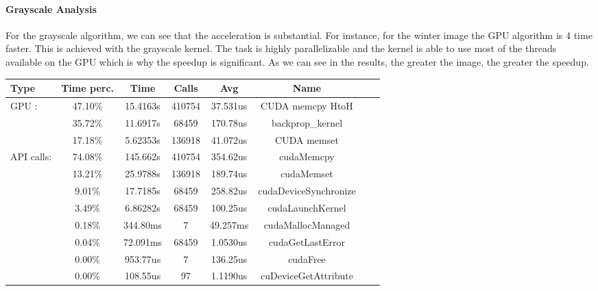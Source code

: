 \documentclass[11pt]{article}
\begin{document}
\paragraph*{Grayscale Analysis}
For the grayscale algorithm, we can see that the acceleration is substantial. For instance, for the winter image the GPU algorithm is 4 time faster. 
This is achieved with the grayscale kernel. The task is highly parallelizable and the kernel is able to use most of the threads available on the GPU
which is why the speedup is significant. 
As we can see in the results, the greater the image, the greater the speedup.

\begin{table}[h]\centering
	\begin{tabular}{|l|c|c|c|c|c|c|c|}
		\hline
		\textbf{Type} & \textbf{Time perc.} & \textbf{Time} & \textbf{Calls} & \textbf{Avg} & \textbf{Name}         \\ \hline
		GPU :         & 47.10\%             & 15.4163s      & 410754         & 37.531us     & CUDA memcpy HtoH      \\ \hline
		              & 35.72\%             & 11.6917s      & 68459          & 170.78us     & backprop\_kernel      \\ \hline
		              & 17.18\%             & 5.62353s      & 136918         & 41.072us     & CUDA memset           \\ \hline
		API calls:    & 74.08\%             & 145.662s      & 410754         & 354.62us     & cudaMemcpy            \\ \hline
		              & 13.21\%             & 25.9788s      & 136918         & 189.74us     & cudaMemset            \\ \hline
		              & 9.01\%              & 17.7185s      & 68459          & 258.82us     & cudaDeviceSynchronize \\ \hline
		              & 3.49\%              & 6.86282s      & 68459          & 100.25us     & cudaLaunchKernel      \\ \hline
		              & 0.18\%              & 344.80ms      & 7              & 49.257ms     & cudaMallocManaged     \\ \hline
		              & 0.04\%              & 72.091ms      & 68459          & 1.0530us     & cudaGetLastError      \\ \hline
		              & 0.00\%              & 953.77us      & 7              & 136.25us     & cudaFree              \\ \hline
		              & 0.00\%              & 108.55us      & 97             & 1.1190us     & cuDeviceGetAttribute  \\ \hline

\end{tabular}
\end{table}
\end{document}
